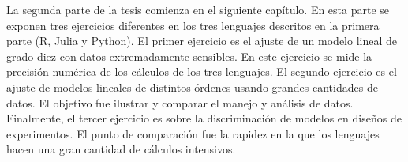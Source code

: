 La segunda parte de la tesis comienza en el siguiente capítulo. En esta parte se exponen tres ejercicios diferentes en los tres lenguajes descritos en la primera parte (\textsf{R, Julia} y \textsf{Python}). El primer ejercicio es el ajuste de un modelo lineal de grado diez con datos extremadamente sensibles. En este ejercicio se mide la precisión numérica de los cálculos de los tres lenguajes. El segundo ejercicio es el ajuste de modelos lineales de distintos órdenes usando grandes cantidades de datos. El objetivo fue ilustrar y comparar el manejo y análisis de datos. Finalmente, el tercer ejercicio es sobre la discriminación de modelos en diseños de experimentos. El punto de comparación fue la rapidez en la que los lenguajes hacen una gran cantidad de cálculos intensivos. 


